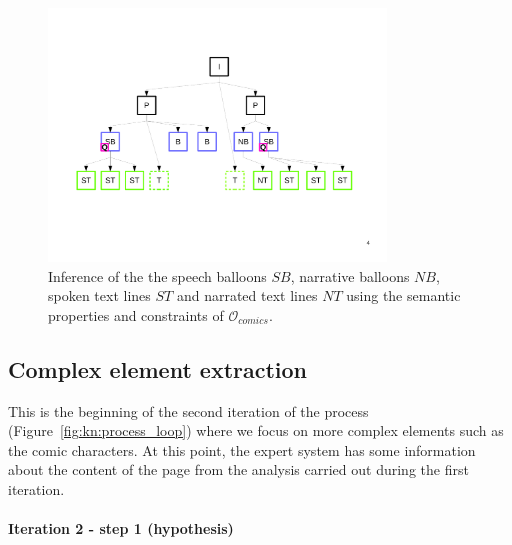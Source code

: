  \begin{figure}[!ht]  %
   \centering
  \includegraphics[trim= 30px 168px 20px 110px, clip, width=0.8\textwidth]{graph_infer_1.pdf}
  \caption[Inference of the speech balloons, narrative balloons, spoken text lines and narrated text lines using the semantic properties of the knowledge base]{Inference of the the speech balloons $SB$, narrative balloons $NB$, spoken text lines $ST$ and narrated text lines $NT$ using the semantic properties and constraints of $\mathcal{O}_{comics}$.
  }
  \label{fig:kn:graph_specific_types}
 \end{figure}


\subsection{Complex element extraction} %
\label{sub:complex_element_extraction}

This is the beginning of the second iteration of the process (Figure~\ref{fig:kn:process_loop}) where we focus on more complex elements such as the comic characters.
At this point, the expert system has some information about the content of the page from the analysis carried out during the first iteration.

\paragraph{Iteration 2 - step 1 (hypothesis)} %
\label{par:step_4}

